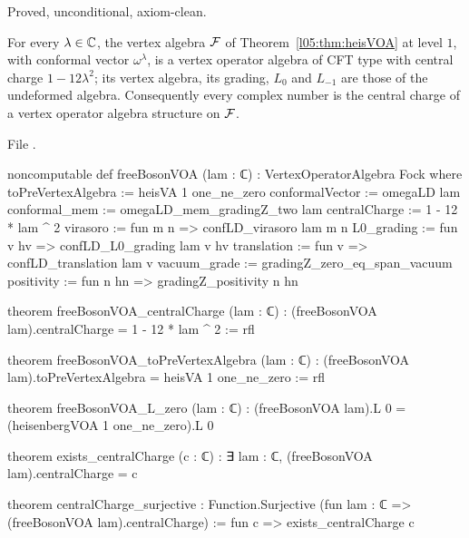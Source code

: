 \begin{status}
Proved, unconditional, axiom-clean.
\end{status}

\begin{theorem}\label{l05:thm:freeboson}
For every $\lambda\in{\mathbb{C}}$, the vertex algebra $\mathcal{F}$ of Theorem~\ref{l05:thm:heisVOA} at level $1$, with
conformal vector $\omega^\lambda$, is a vertex operator algebra of CFT type with central charge
$1-12\lambda^2$; its vertex algebra, its grading, $L_0$ and $L_{-1}$ are those of the undeformed algebra.
Consequently every complex number is the central charge of a vertex operator algebra structure on $\mathcal{F}$.
\end{theorem}

\noindent File .
\begin{leancode}
noncomputable def freeBosonVOA (lam : ℂ) : VertexOperatorAlgebra Fock where
  toPreVertexAlgebra := heisVA 1 one_ne_zero
  conformalVector := omegaLD lam
  conformal_mem := omegaLD_mem_gradingZ_two lam
  centralCharge := 1 - 12 * lam ^ 2
  virasoro := fun m n => confLD_virasoro lam m n
  L0_grading := fun v hv => confLD_L0_grading lam v hv
  translation := fun v => confLD_translation lam v
  vacuum_grade := gradingZ_zero_eq_span_vacuum
  positivity := fun n hn => gradingZ_positivity n hn

theorem freeBosonVOA_centralCharge (lam : ℂ) :
    (freeBosonVOA lam).centralCharge = 1 - 12 * lam ^ 2 := rfl

theorem freeBosonVOA_toPreVertexAlgebra (lam : ℂ) :
    (freeBosonVOA lam).toPreVertexAlgebra = heisVA 1 one_ne_zero := rfl

theorem freeBosonVOA_L_zero (lam : ℂ) :
    (freeBosonVOA lam).L 0 = (heisenbergVOA 1 one_ne_zero).L 0

theorem exists_centralCharge (c : ℂ) :
    ∃ lam : ℂ, (freeBosonVOA lam).centralCharge = c

theorem centralCharge_surjective :
    Function.Surjective (fun lam : ℂ => (freeBosonVOA lam).centralCharge) :=
  fun c => exists_centralCharge c
\end{leancode}

